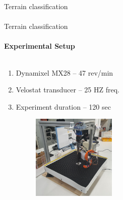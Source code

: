 \documentclass[aspectratio=169]{beamer}
\begin{document}
\begin{frame}[t]{Terrain classification}
    \framesubtitle{}
\end{frame}

\begin{frame}[t]{Terrain classification}
    \framesubtitle{Experimental Setup}
    \vspace{-15pt}
    \begin{columns}[T,onlytextwidth]
        \begin{column}{0.49\textwidth}
            \begin{enumerate}
                \item Dynamixel MX28 -- 47 rev/min
                \item Velostat transducer -- 25 HZ freq.
                \item Experiment duration -- 120 sec
            \end{enumerate}
            \vspace{-0.3cm}
            \begin{figure}[H]
                \centering\includegraphics[height=4cm,width=1\textwidth,keepaspectratio]{s_shape_leg/s_leg_setup.JPG}
                \label{fig:s_shape_leg/}
            \end{figure}
        \end{column}
        \begin{column}{0.49\textwidth}
            \vspace{-0.5cm}
            \begin{figure}[H]
                \begin{subfigure}{\textwidth}

\end{subfigure}
\end{figure}
\end{column}
\end{columns}
\end{frame}
\end{document}
